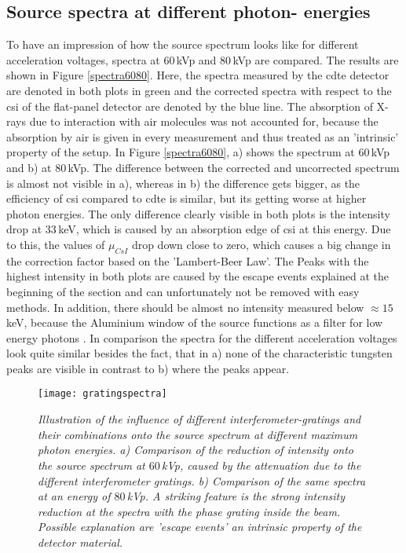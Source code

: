 \subsection{Source spectra at different photon- energies}\label{subsec:spectra}
To have an impression of how the source spectrum looks like for different acceleration voltages, spectra at $60\,$kVp and $80\,$kVp are compared. The results are shown in Figure \ref{spectra6080}. Here, the spectra measured by the \gls{cdte} detector are denoted in both plots in green and the corrected spectra with respect to the \gls{csi} of the flat-panel detector are denoted by the blue line. The absorption of X-rays due to interaction with air molecules was not accounted for, because the absorption by air is given in every measurement and thus treated as an 'intrinsic' property of the setup. In Figure \ref{spectra6080}, a) shows the spectrum at $60\,$kVp and b) at $80\,$kVp. The difference between the corrected and uncorrected spectrum is almost not visible in a), whereas in b) the difference gets bigger, as the efficiency of \gls{csi} compared to \gls{cdte} is similar, but its getting worse at higher photon energies. The only difference clearly visible in both plots is the intensity drop at $33\,$keV, which is caused by an absorption edge of \gls{csi} at this energy. Due to this, the values of $\mu_{CsI}$ drop down close to zero, which causes a big change in the correction factor based on the 'Lambert-Beer Law'. The Peaks with the highest intensity in both plots are caused by the escape events explained at the beginning of the section and can unfortunately not be removed with easy methods. In addition, there should be almost no intensity measured below $\approx 15\,$keV, because the Aluminium window of the source functions as a filter for low energy photons . In comparison the spectra for the different acceleration voltages look quite similar besides the fact, that in a) none of the characteristic tungsten peaks are visible in contrast to b) where the peaks appear.      
\begin{figure}%
	\begin{center}
		\texttt{[image: gratingspectra]}
	\end{center}
	\caption[Influence of the interferometer gratings onto the source spectrum]{\textit{Illustration of the influence of different interferometer-gratings and their combinations onto the source spectrum at different maximum photon energies. a) Comparison of the reduction of intensity onto the source spectrum at $60\,$kVp, caused by the attenuation due to the different interferometer gratings. b) Comparison of the same spectra at an energy of $80\,$kVp. A striking feature is the strong intensity reduction at the spectra with the phase grating inside the beam. Possible explanation are 'escape events' an intrinsic property of the detector material.}}
	\label{specgrat}
\end{figure}
